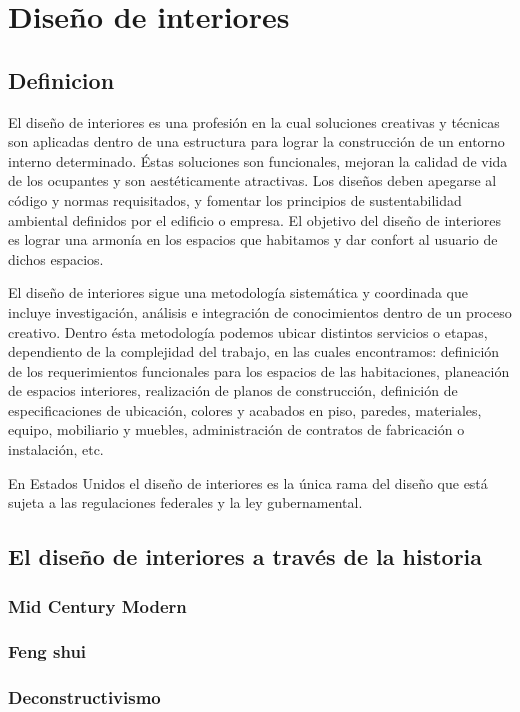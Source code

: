 \section{Diseño de interiores}
\subsection{Definicion}
El diseño de interiores es una profesión en la cual soluciones creativas y técnicas son aplicadas dentro de una estructura para lograr la construcción de un entorno interno determinado. Éstas soluciones son funcionales, mejoran la calidad de vida de los ocupantes y son aestéticamente atractivas. Los diseños deben apegarse al código y normas requisitados, y fomentar los principios de sustentabilidad ambiental definidos por el edificio o empresa. El objetivo del diseño de interiores es lograr una armonía en los espacios que habitamos y dar confort al usuario de dichos espacios.\cite{B01} \par
El diseño de interiores sigue una metodología sistemática y coordinada que incluye investigación, análisis e integración de conocimientos dentro de un proceso creativo. Dentro ésta metodología podemos ubicar distintos servicios o etapas, dependiento de la complejidad del trabajo, en las cuales encontramos: definición de los requerimientos funcionales para los espacios de las habitaciones, planeación de espacios interiores, realización de planos de construcción, definición de especificaciones de ubicación, colores y acabados en piso, paredes, materiales, equipo, mobiliario y muebles, administración de contratos de fabricación o instalación, etc.\par
En Estados Unidos el diseño de interiores es la única rama del diseño que está sujeta a las regulaciones federales y la ley gubernamental.\cite{B02}
\subsection{El diseño de interiores a través de la historia}

\subsubsection{Mid Century Modern}
\subsubsection{Feng shui}
\subsubsection{Deconstructivismo}
